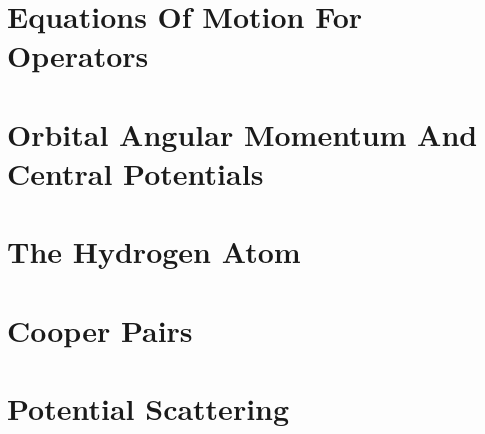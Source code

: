 \documentclass[11pt,twoside,openright]{book}
\begin{document}
\chapter{Equations Of Motion For Operators}





\chapter{Orbital Angular Momentum And Central Potentials}








\chapter{The Hydrogen Atom}






\chapter{Cooper Pairs}


\chapter{Potential Scattering}









\end{document}
